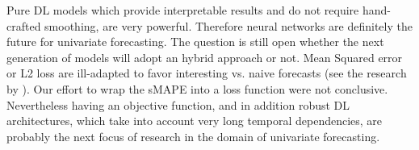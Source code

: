 \documentclass{article}
\begin{document}
Pure DL models which provide interpretable results and do not require hand-crafted smoothing, are very powerful. Therefore neural networks are definitely the future for univariate forecasting. 
The question is still open whether the next generation of models will adopt an hybrid approach or not. Mean Squared error or L2 loss are ill-adapted to favor interesting  vs. naive forecasts (see the research by  \citet{dilateloss}).
Our effort to wrap the sMAPE into a loss function were not conclusive. Nevertheless having an objective function, and in addition robust DL architectures, which take into account very long temporal dependencies,
are probably the next focus of research in the domain of univariate forecasting.





\end{document}
